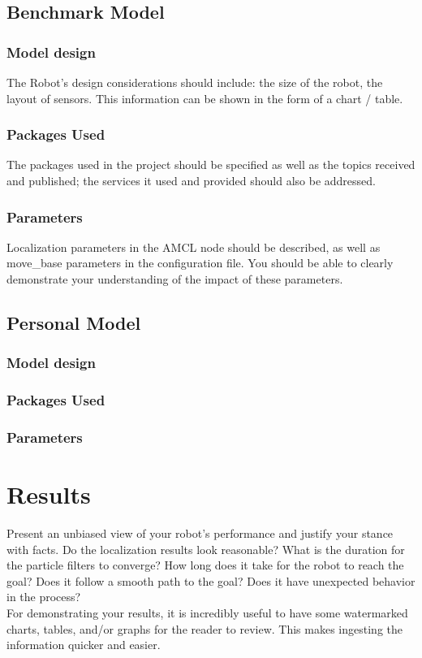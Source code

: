\documentclass[10pt,journal,compsoc]{IEEEtran}
\begin{document}
    \subsection{Benchmark Model}
    \subsubsection{Model design}
    The Robot's design considerations should include: the size of the robot, the layout of sensors. This information can be shown in the form of a chart / table.
    
    \subsubsection{Packages Used}
    The packages used in the project should be specified as well as the topics received and published; the services it used and provided should also be addressed. 
    
    \subsubsection{Parameters}
    Localization parameters in the AMCL node should be described, as well as move\_base parameters in the configuration file. You should be able to clearly demonstrate your understanding of the impact of these parameters.
    
    \subsection{Personal Model}
    \subsubsection{Model design}
    \subsubsection{Packages Used}
    \subsubsection{Parameters}
    
    
    \section{Results}
    Present an unbiased view of your robot's performance and justify your stance with facts. Do the localization results look reasonable? What is the duration for the particle filters to converge? How long does it take for the robot to reach the goal? Does it follow a smooth path to the goal? Does it have unexpected behavior in the process? \\
    For demonstrating your results, it is incredibly useful to have some watermarked charts, tables, and/or graphs for the reader to review. This makes ingesting the information quicker and easier.
    
\end{document}
